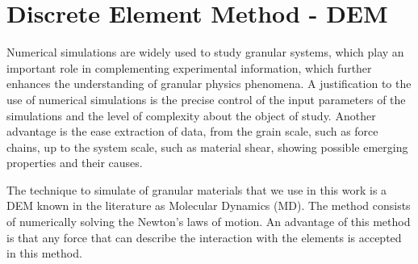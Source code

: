 \chapter{Discrete Element Method - DEM}
\label{chap:DEM}

    Numerical simulations are widely used to study granular systems, which play an important role in complementing experimental information, which further enhances the understanding of granular physics phenomena. A justification to the use of numerical simulations is the precise control of the input parameters of the simulations and the level of complexity about the object of study. Another advantage is the ease extraction of data, from the grain scale, such as force chains, up to the system scale, such as material shear, showing possible emerging properties and their causes.


    The technique to simulate of granular materials that we use in this work is a DEM known in the literature as Molecular Dynamics (MD). The method consists of numerically solving the Newton's laws of motion. An advantage of this method is that any force that can describe the interaction with the elements is accepted in this method.

